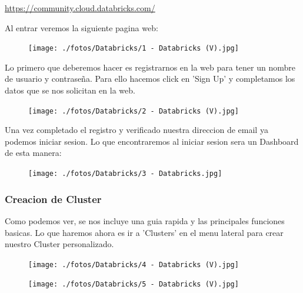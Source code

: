 \documentclass[a4paper,10pt]{article}
\begin{document}
\href{https://community.cloud.databricks.com/}{https://community.cloud.databricks.com/}

Al entrar veremos la siguiente pagina web:

\begin{figure}[H]
\begin{center}
\texttt{[image: ./fotos/Databricks/1 - Databricks (V).jpg]}
\end{center}
\end{figure}

Lo primero que deberemos hacer es registrarnos en la web para tener un nombre de usuario y contraseña. Para ello hacemos click en 'Sign Up' y completamos los datos que se nos solicitan en la web.

\begin{figure}[H]
\begin{center}
\texttt{[image: ./fotos/Databricks/2 - Databricks (V).jpg]}
\end{center}
\end{figure}

Una vez completado el registro y verificado nuestra direccion de email ya podemos iniciar sesion. Lo que encontraremos al iniciar sesion sera un Dashboard de esta manera:

\begin{figure}[H]
\begin{center}
\texttt{[image: ./fotos/Databricks/3 - Databricks.jpg]}
\end{center}
\end{figure}

\subsubsection{Creacion de Cluster}

Como podemos ver, se nos incluye una guia rapida y las principales funciones basicas. Lo que haremos ahora es ir a 'Clusters' en el menu lateral para crear nuestro Cluster personalizado.

\begin{figure}[H]
\begin{center}
\texttt{[image: ./fotos/Databricks/4 - Databricks (V).jpg]}
\end{center}
\end{figure}

\begin{figure}[H]
\begin{center}
\texttt{[image: ./fotos/Databricks/5 - Databricks (V).jpg]}
\end{center}
\end{figure}
\end{document}
